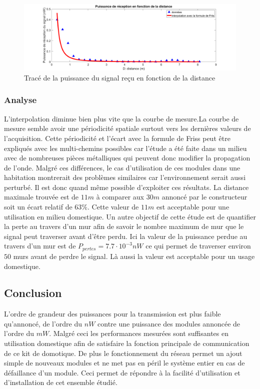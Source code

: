 \documentclass{rapportENS}
\begin{document}
\begin{figure}[h!]
    \centering
    \includegraphics[width=\linewidth]{plot_radio.png}
    \caption{Tracé de la puissance du signal reçu en fonction de la distance}
    \label{fig:plot_radio}
\end{figure}

\subsubsection{Analyse}
L'interpolation diminue bien plus vite que la courbe de mesure.La courbe de mesure semble avoir une périodicité spatiale surtout vers les dernières valeurs de l'acquisition. Cette périodicité et l'écart avec la formule de Friss peut être expliqués avec les multi-chemins possibles car l'étude a été faite dans un milieu avec de nombreuses pièces métalliques qui peuvent donc modifier la propagation de l'onde. \newline
Malgré ces différences, le cas d'utilisation de ces modules dans une habitation montrerait des problèmes similaires car l'environnement serait aussi perturbé. Il est donc quand même possible d'exploiter ces résultats. La distance maximale trouvée est de $11m$ à comparer aux $30m$ annoncé par le constructeur soit un écart relatif de $63\%$. Cette valeur de $11m$ est acceptable pour une utilisation en milieu domestique. 
\newline
Un autre objectif de cette étude est de quantifier la perte au travers d'un mur afin de savoir le nombre maximum de mur que le signal peut traverser avant d'être perdu. Ici la valeur de la puissance perdue au travers d'un mur est de $P_{pertes}=7.7\cdot 10^{-3} nW$ ce qui permet de traverser environ $50$ murs avant de perdre le signal. Là aussi la valeur est acceptable pour un usage domestique. 

\subsection{Conclusion}
L'ordre de grandeur des puissances pour la transmission est plus faible qu'annoncé, de l'ordre du $nW$ contre une puissance des modules annoncée de l'ordre du $mW$. Malgré ceci les performances mesurées sont suffisantes en utilisation domestique afin de satisfaire la fonction principale de  communication de ce kit de domotique. De plus le fonctionnement du réseau permet un ajout simple de nouveaux modules et ne met pas en péril le système entier en cas de défaillance d'un module. Ceci permet de répondre à la facilité d'utilisation et d'installation de cet ensemble étudié.
\end{document}
